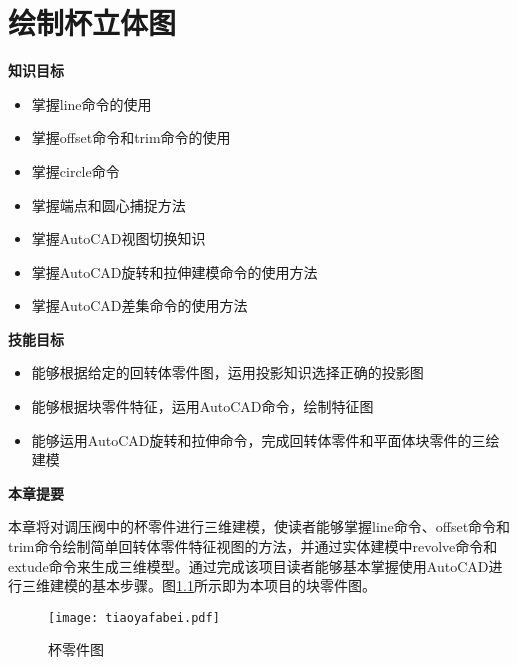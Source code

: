 \chapter{绘制杯立体图}\label{chap:bei}
{\bfseries 知识目标}
\begin{itemize}
\item 掌握line命令的使用
\item 掌握offset命令和trim命令的使用
\item 掌握circle命令
\item 掌握端点和圆心捕捉方法
\item 掌握AutoCAD视图切换知识
\item 掌握AutoCAD旋转和拉伸建模命令的使用方法
\item 掌握AutoCAD差集命令的使用方法
\end{itemize}

{\bfseries 技能目标}
\begin{itemize}
\item 能够根据给定的回转体零件图，运用投影知识选择正确的投影图
\item 能够根据块零件特征，运用AutoCAD命令，绘制特征图
\item 能够运用AutoCAD旋转和拉伸命令，完成回转体零件和平面体块零件的三绘建模
\end{itemize}

{\bfseries 本章提要}

本章将对调压阀中的杯零件进行三维建模，使读者能够掌握line命令、offset命令和trim命令绘制简单回转体零件特征视图的方法，并通过实体建模中revolve命令和extude命令来生成三维模型。通过完成该项目读者能够基本掌握使用AutoCAD进行三维建模的基本步骤。图\ref{fig:tiaoyafabei}所示即为本项目的块零件图。
\noindent
\begin{figure}[htbp]
\centering
\texttt{[image: tiaoyafabei.pdf]}
\caption{杯零件图}\label{fig:tiaoyafabei}
\end{figure}
\endinput